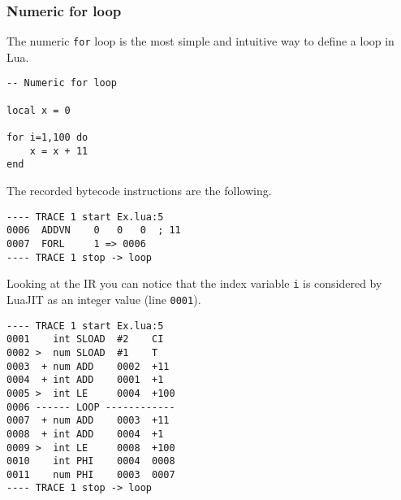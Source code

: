 \subsubsection{Numeric for loop}
The numeric \texttt{for} loop is the most simple and intuitive way to define a loop in Lua.
\begin{mdframed}[style=LuaStyleFrame]
\begin{lstlisting}[style=LuaStyle]
-- Numeric for loop

local x = 0

for i=1,100 do
 	x = x + 11
end
\end{lstlisting}
\end{mdframed}
\noindent The recorded bytecode instructions are the following.
\begin{lstlisting}[style=DumpStyle]
---- TRACE 1 start Ex.lua:5
0006  ADDVN    0   0   0  ; 11
0007  FORL     1 => 0006
---- TRACE 1 stop -> loop
\end{lstlisting}
\noindent Looking at the IR you can notice that the index variable \texttt{i} is considered by LuaJIT as an integer value (line \texttt{0001}).
\begin{multicols}{2}
\begin{lstlisting}[style=DumpStyle]
---- TRACE 1 start Ex.lua:5
0001    int SLOAD  #2    CI
0002 >  num SLOAD  #1    T
0003  + num ADD    0002  +11 
0004  + int ADD    0001  +1  
0005 >  int LE     0004  +100
0006 ------ LOOP ------------
0007  + num ADD    0003  +11 
0008  + int ADD    0004  +1  
0009 >  int LE     0008  +100
0010    int PHI    0004  0008
0011    num PHI    0003  0007
---- TRACE 1 stop -> loop
\end{lstlisting}
\end{multicols}




